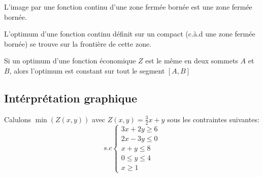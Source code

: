 \begin{theor}
L'image par une fonction continu d'une zone fermée bornée est une zone fermée
bornée.
\end{theor}

\begin{theor}
L'optimum d'une fonction continu définit sur un compact (c.à.d une zone fermée
bornée) se trouve sur la frontière de cette zone.
\end{theor}

\begin{theor}
Si un optimum d'une fonction économique $Z$ est le même en deux sommets $A$ et
$B$, alors l'optimum est constant sur tout le segment $[A,B]$
\end{theor}

\subsection{Intérprétation graphique}
Calulons $\min(Z(x,y))$ avec $Z(x,y) = \frac{3}{2}x + y$ sous les contraintes suivantes:
\begin{equation*}
  s.c
    \begin{cases}
      3x + 2y \geq 6 \\
      2x - 3y \leq 0 \\
      x + y \leq 8 \\
      0 \leq y \leq 4 \\
      x \geq 1
    \end{cases}
\end{equation*}

